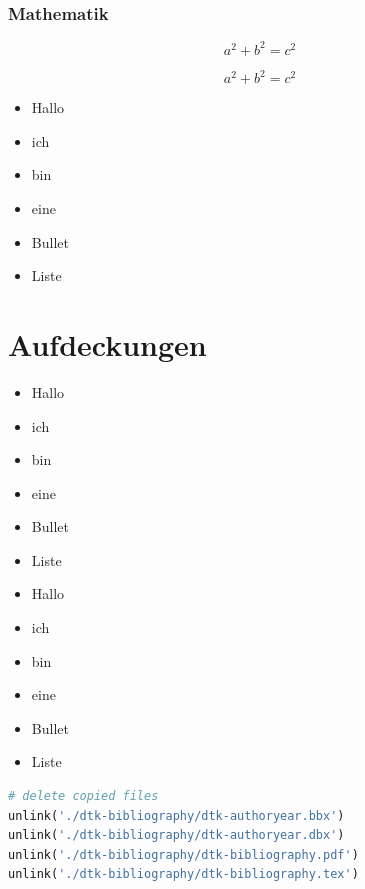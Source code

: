 \documentclass[ngerman]{beamer}
\begin{document}
\begin{frame}
\frametitle{Mathematik}

\[a^2 + b^2 = c^2 \]

\begin{equation}
a^2 + b^2 = c^2
\end{equation}


\end{frame}

\begin{frame}

\begin{itemize}
	\item Hallo \pause
	\item ich \pause
	\item bin  \pause
	\item eine \pause 
	\item Bullet
	\item Liste
\end{itemize}

\end{frame}

\section{Aufdeckungen}

\begin{frame}

\begin{itemize}
	\item<1-> Hallo 
	\item<2> ich 
	\item<-2> bin  
	\item<3-> eine 
	\item<1> Bullet
	\item<2> Liste
\end{itemize}

\end{frame}


\begin{frame}

\begin{itemize}
	\item<1-> Hallo 
	\item<2-> ich 
	\item<3-> bin  
	\item<4-> eine 
	\item<5-> Bullet
	\item<6-> Liste
\end{itemize}

\end{frame}

\begin{frame}[fragile]

\begin{lstlisting}[language={Python}]
# delete copied files
unlink('./dtk-bibliography/dtk-authoryear.bbx')
unlink('./dtk-bibliography/dtk-authoryear.dbx')
unlink('./dtk-bibliography/dtk-bibliography.pdf')
unlink('./dtk-bibliography/dtk-bibliography.tex')
\end{lstlisting}

\end{frame}
\end{document}
